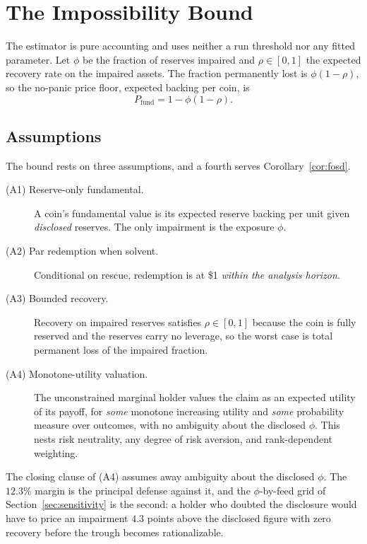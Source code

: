 \section{The Impossibility Bound}
\label{sec:ident}

The estimator is pure accounting and uses neither a run threshold nor
any fitted parameter. Let $\phi$ be the fraction of reserves impaired and $\rho\in[0,1]$ the
expected recovery rate on the impaired assets. The fraction permanently lost is
$\phi(1-\rho)$, so the no-panic price floor, expected backing per coin, is
\begin{equation}
P_{\mathrm{fund}} = 1 - \phi(1-\rho).
\label{eq:floor}
\end{equation}

\subsection{Assumptions}
The bound rests on three assumptions, and a fourth serves Corollary~\ref{cor:fosd}.
\begin{description}
\item[(A1) Reserve-only fundamental.] A coin's fundamental value is its expected reserve
  backing per unit given \emph{disclosed} reserves. The only impairment is the exposure $\phi$.
\item[(A2) Par redemption when solvent.] Conditional on rescue, redemption is at \$1
  \emph{within the analysis horizon}.
\item[(A3) Bounded recovery.] Recovery on impaired reserves satisfies $\rho\in[0,1]$ because
  the coin is fully reserved and the reserves carry no leverage, so the worst case is total permanent
  loss of the impaired fraction.
\item[(A4) Monotone-utility valuation.] The unconstrained marginal holder values the claim as
  an expected utility of its payoff, for \emph{some} monotone increasing utility and
  \emph{some} probability measure over outcomes, with no ambiguity about the disclosed $\phi$.
  This nests risk neutrality, any degree of risk aversion, and rank-dependent weighting.
\end{description}

The closing clause of (A4) assumes away ambiguity about the disclosed $\phi$. The $12.3\%$
margin is the principal defense against it, and the $\phi$-by-feed grid of
Section~\ref{sec:sensitivity} is the second: a holder who doubted the disclosure would have to
price an impairment $4.3$ points above the disclosed figure with zero recovery before the
trough becomes rationalizable.

